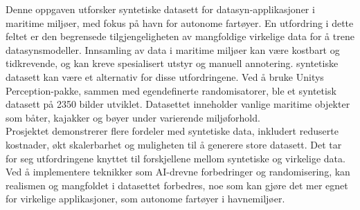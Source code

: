 

Denne oppgaven utforsker syntetiske datasett for datasyn-applikasjoner i maritime miljøer, med fokus på havn for autonome fartøyer. En utfordring i dette feltet er den begrensede tilgjengeligheten av mangfoldige virkelige data for å trene datasynsmodeller. Innsamling av data i maritime miljøer kan være kostbart og tidkrevende, og kan kreve spesialisert utstyr og manuell annotering. syntetiske datasett kan være et alternativ for disse utfordringene. Ved å bruke Unitys Perception-pakke, sammen med egendefinerte randomisatorer, ble et syntetisk datasett på 2350 bilder utviklet. Datasettet inneholder vanlige maritime objekter som båter, kajakker og bøyer under varierende miljøforhold.\\

\noindent Prosjektet demonstrerer flere fordeler med syntetiske data, inkludert reduserte kostnader, økt skalerbarhet og muligheten til å generere store datasett. Det tar for seg utfordringene knyttet til forskjellene mellom syntetiske og virkelige data. Ved å implementere teknikker som AI-drevne forbedringer og randomisering, kan realismen og mangfoldet i datasettet forbedres, noe som kan gjøre det mer egnet for virkelige applikasjoner, som autonome fartøyer i havnemiljøer.
